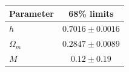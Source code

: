 \begin{tabular} { l  c}

 Parameter &  68\% limits\\
\hline
{\boldmath$h              $} & $0.7016\pm 0.0016          $\\

{\boldmath$Ω_m            $} & $0.2847\pm 0.0089          $\\

{\boldmath$M              $} & $0.12\pm 0.19              $\\
\hline
\end{tabular}
